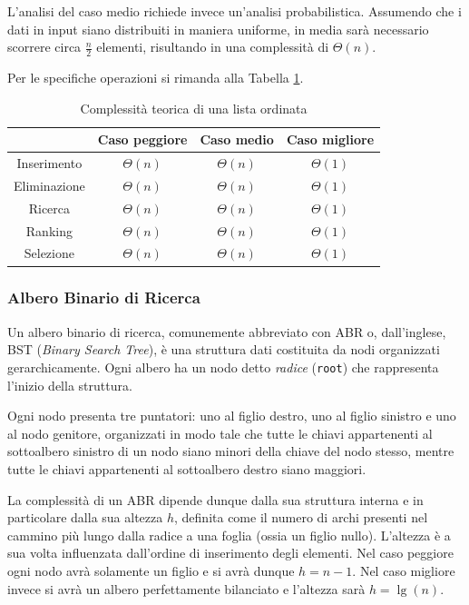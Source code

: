 L'analisi del caso medio richiede invece un'analisi probabilistica. Assumendo che i dati in input siano distribuiti in maniera uniforme, in media sarà necessario scorrere circa $\frac{n}{2}$ elementi, risultando in una complessità di $\Theta(n)$.

Per le specifiche operazioni si rimanda alla Tabella \ref{tab:complessita_lista_ordinata}.

\begin{table}[h!]
	\centering
	\begin{tabular}{ |c||c|c|c|  }
		\hhline{~---}
		\multicolumn{1}{c|}{} & Caso peggiore & Caso medio & Caso migliore \\
		\hline
		Inserimento & $\Theta(n)$ & $\Theta(n)$ & $\Theta(1)$\\
		\hline
		Eliminazione & $\Theta(n)$ & $\Theta(n)$ & $\Theta(1)$\\
		\hline
		Ricerca & $\Theta(n)$ & $\Theta(n)$ & $\Theta(1)$\\
		\hline
		Ranking & $\Theta(n)$ & $\Theta(n)$ & $\Theta(1)$\\
		\hline
		Selezione & $\Theta(n)$ & $\Theta(n)$ & $\Theta(1)$\\
		\hline
	\end{tabular}
	\caption{Complessità teorica di una lista ordinata}
	\label{tab:complessita_lista_ordinata}
\end{table}


\subsubsection*{Albero Binario di Ricerca}
Un albero binario di ricerca, comunemente abbreviato con ABR o, dall'inglese, BST (\textit{Binary Search Tree}), è una struttura dati costituita da nodi organizzati gerarchicamente. Ogni albero ha un nodo detto \textit{radice} (\texttt{root}) che rappresenta l'inizio della struttura.

Ogni nodo presenta tre puntatori: uno al figlio destro, uno al figlio sinistro e uno al nodo genitore, organizzati in modo tale che tutte le chiavi appartenenti al sottoalbero sinistro di un nodo siano minori della chiave del nodo stesso, mentre tutte le chiavi appartenenti al sottoalbero destro siano maggiori.

La complessità di un ABR dipende dunque dalla sua struttura interna e in particolare dalla sua altezza $h$, definita come il numero di archi presenti nel cammino più lungo dalla radice a una foglia (ossia un figlio nullo). L'altezza è a sua volta influenzata dall'ordine di inserimento degli elementi. Nel caso peggiore ogni nodo avrà solamente un figlio e si avrà dunque $h = n-1$. Nel caso migliore invece si avrà un albero perfettamente bilanciato e l'altezza sarà $h = \lg(n)$.

